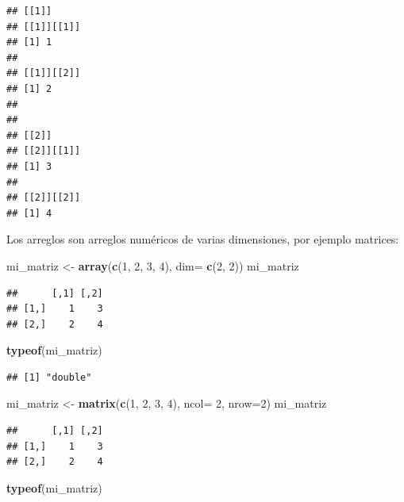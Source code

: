 \documentclass[]{book}
\newenvironment{Shaded}{\begin{snugshade}}{\end{snugshade}}
\newcommand{\KeywordTok}[1]{\textcolor[rgb]{0.13,0.29,0.53}{\textbf{#1}}}
\newcommand{\DataTypeTok}[1]{\textcolor[rgb]{0.13,0.29,0.53}{#1}}
\newcommand{\DecValTok}[1]{\textcolor[rgb]{0.00,0.00,0.81}{#1}}
\newcommand{\StringTok}[1]{\textcolor[rgb]{0.31,0.60,0.02}{#1}}
\newcommand{\NormalTok}[1]{#1}
\theoremstyle{definition}
\theoremstyle{definition}
\theoremstyle{definition}
\theoremstyle{remark}
\begin{document}
\begin{verbatim}
## [[1]]
## [[1]][[1]]
## [1] 1
## 
## [[1]][[2]]
## [1] 2
## 
## 
## [[2]]
## [[2]][[1]]
## [1] 3
## 
## [[2]][[2]]
## [1] 4
\end{verbatim}

Los arreglos son arreglos numéricos de varias dimensiones, por ejemplo
matrices:

\begin{Shaded}
\begin{Highlighting}[]
\NormalTok{mi_matriz <-}\StringTok{ }\KeywordTok{array}\NormalTok{(}\KeywordTok{c}\NormalTok{(}\DecValTok{1}\NormalTok{, }\DecValTok{2}\NormalTok{, }\DecValTok{3}\NormalTok{, }\DecValTok{4}\NormalTok{), }\DataTypeTok{dim=} \KeywordTok{c}\NormalTok{(}\DecValTok{2}\NormalTok{, }\DecValTok{2}\NormalTok{))}
\NormalTok{mi_matriz}
\end{Highlighting}
\end{Shaded}

\begin{verbatim}
##      [,1] [,2]
## [1,]    1    3
## [2,]    2    4
\end{verbatim}

\begin{Shaded}
\begin{Highlighting}[]
\KeywordTok{typeof}\NormalTok{(mi_matriz)}
\end{Highlighting}
\end{Shaded}

\begin{verbatim}
## [1] "double"
\end{verbatim}

\begin{Shaded}
\begin{Highlighting}[]
\NormalTok{mi_matriz <-}\StringTok{ }\KeywordTok{matrix}\NormalTok{(}\KeywordTok{c}\NormalTok{(}\DecValTok{1}\NormalTok{, }\DecValTok{2}\NormalTok{, }\DecValTok{3}\NormalTok{, }\DecValTok{4}\NormalTok{), }\DataTypeTok{ncol=} \DecValTok{2}\NormalTok{, }\DataTypeTok{nrow=}\DecValTok{2}\NormalTok{)}
\NormalTok{mi_matriz}
\end{Highlighting}
\end{Shaded}

\begin{verbatim}
##      [,1] [,2]
## [1,]    1    3
## [2,]    2    4
\end{verbatim}

\begin{Shaded}
\begin{Highlighting}[]
\KeywordTok{typeof}\NormalTok{(mi_matriz)}
\end{Highlighting}
\end{Shaded}
\end{document}
